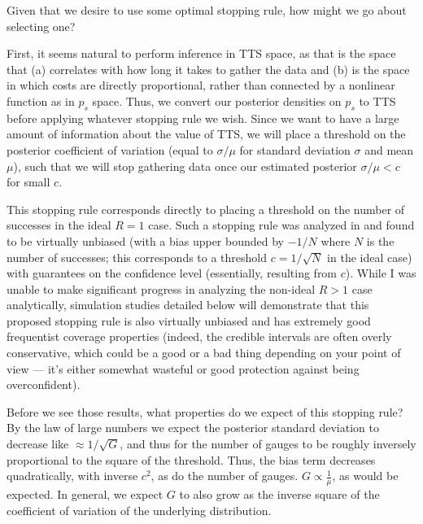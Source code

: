 Given that we desire to use some optimal stopping rule, how might we go about selecting one?

First, it seems natural to perform inference in TTS space, as that is the space that (a) correlates with how long it takes to gather the data and (b) is the space in which costs are directly proportional, rather than connected by a nonlinear function as in $p_s$ space. Thus, we convert our posterior densities on $p_s$ to TTS before applying whatever stopping rule we wish. Since we want to have a large amount of information about the value of TTS, we will place a threshold on the posterior coefficient of variation (equal to $\sigma/\mu$ for standard deviation $\sigma$ and mean $\mu$), such that we will stop gathering data once our estimated posterior $\sigma/\mu < c$ for small $c$.

This stopping rule corresponds directly to placing a threshold on the number of successes in the ideal $R=1$ case. Such a stopping rule was analyzed in \cite{Mendo2006} and found to be virtually unbiased (with a bias upper bounded by $-1/N$ where $N$ is the number of successes; this corresponds to a threshold $c=1/\sqrt{N}$ in the ideal case) with guarantees on the confidence level (essentially, resulting from $c$). While I was unable to make significant progress in analyzing the non-ideal $R>1$ case analytically, simulation studies detailed below will demonstrate that this proposed stopping rule is also virtually unbiased and has extremely good frequentist coverage properties (indeed, the credible intervals are often overly conservative, which could be a good or a bad thing depending on your point of view --- it's either somewhat wasteful or good protection against being overconfident).

Before we see those results, what properties do we expect of this stopping rule? By the law of large numbers we expect the posterior standard deviation to decrease like $\approx 1/\sqrt{G}$, and thus for the number of gauges to be roughly inversely proportional to the square of the threshold. Thus, the bias term decreases quadratically, with inverse $c^2$, as do the number of gauges. $G \propto \frac1\mu$, as would be expected. In general, we expect $G$ to also grow as the inverse square of the coefficient of variation of the underlying distribution.

